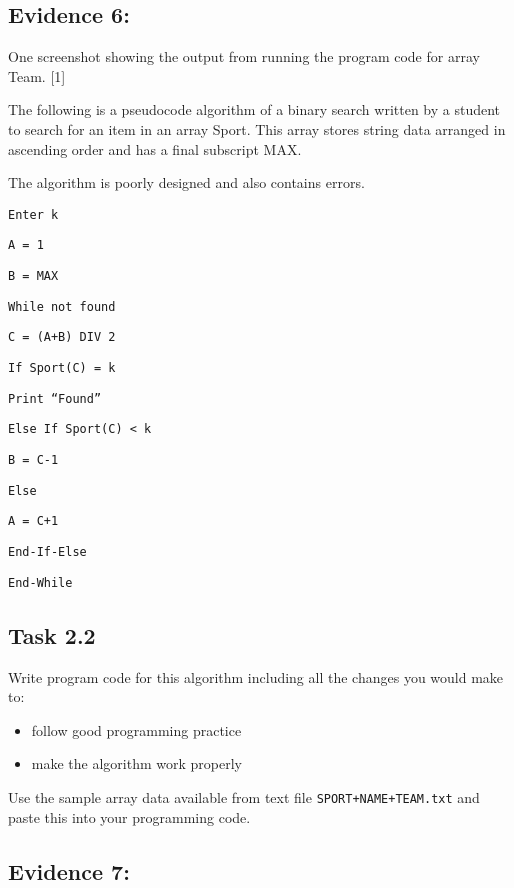 \subsection*{Evidence 6: }

One screenshot showing the output from running the program code for
array Team.\hfill{} {[}1{]}

The following is a pseudocode algorithm of a binary search written
by a student to search for an item in an array Sport. This array stores
string data arranged in ascending order and has a final subscript
MAX. 

The algorithm is poorly designed and also contains errors. 

\noindent %
\noindent\begin{minipage}[t]{1\columnwidth}%
\texttt{Enter k }

\texttt{A = 1 }

\texttt{B = MAX }

\texttt{While not found }

\texttt{\qquad{}C = (A+B) DIV 2 }

\texttt{\qquad{}If Sport(C) = k }

\texttt{\qquad{}\qquad{}Print \textquotedblleft Found\textquotedblright{} }

\texttt{\qquad{}Else If Sport(C) < k }

\texttt{\qquad{}\qquad{}B = C-1 }

\texttt{\qquad{}Else }

\texttt{\qquad{}\qquad{}A = C+1 }

\texttt{\qquad{}End-If-Else }

\texttt{End-While }%
\end{minipage}

\subsection*{Task 2.2 }

Write program code for this algorithm including all the changes you
would make to: 
\begin{itemize}
\item follow good programming practice 
\item make the algorithm work properly 
\end{itemize}
Use the sample array data available from text file \texttt{SPORT+NAME+TEAM.txt}
and paste this into your programming code. 

\subsection*{Evidence 7: }


